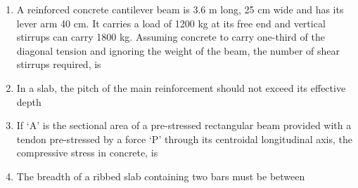 \documentclass[11pt,a4paper]{article}
\begin{document}
\begin{enumerate}
\item{A reinforced concrete cantilever beam is 3.6 m long, 25 cm wide and has its lever arm 40 cm. It carries a load of 1200 kg at its free end and vertical stirrups can carry 1800 kg. Assuming concrete to carry one-third of the diagonal tension and ignoring the weight of the beam, the number of shear stirrups required, is}
\\
\item{In a slab, the pitch of the main reinforcement should not exceed its effective depth}
\\
\item{If `A' is the sectional area of a pre-stressed rectangular beam provided with a tendon pre-stressed by a force `P' through its centroidal longitudinal axis, the compressive stress in concrete, is
}
\\
\item{The breadth of a ribbed slab containing two bars must be between}
\\

\end{enumerate}
\end{document}
